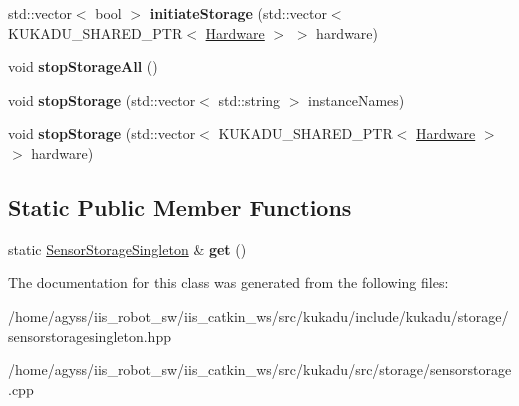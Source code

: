 \begin{DoxyCompactItemize}
\item 
std\+::vector$<$ bool $>$ {\bfseries initiate\+Storage} (std\+::vector$<$ K\+U\+K\+A\+D\+U\+\_\+\+S\+H\+A\+R\+E\+D\+\_\+\+P\+TR$<$ \hyperlink{classkukadu_1_1Hardware}{Hardware} $>$ $>$ hardware)\hypertarget{classkukadu_1_1SensorStorageSingleton_ad19fbc756b50b527869be6ddca355eec}{}\label{classkukadu_1_1SensorStorageSingleton_ad19fbc756b50b527869be6ddca355eec}

\item 
void {\bfseries stop\+Storage\+All} ()\hypertarget{classkukadu_1_1SensorStorageSingleton_a9c7a5f2c7bfe56911995a19b849ee9f9}{}\label{classkukadu_1_1SensorStorageSingleton_a9c7a5f2c7bfe56911995a19b849ee9f9}

\item 
void {\bfseries stop\+Storage} (std\+::vector$<$ std\+::string $>$ instance\+Names)\hypertarget{classkukadu_1_1SensorStorageSingleton_a090d1b7167f9581ee2080b475049b05e}{}\label{classkukadu_1_1SensorStorageSingleton_a090d1b7167f9581ee2080b475049b05e}

\item 
void {\bfseries stop\+Storage} (std\+::vector$<$ K\+U\+K\+A\+D\+U\+\_\+\+S\+H\+A\+R\+E\+D\+\_\+\+P\+TR$<$ \hyperlink{classkukadu_1_1Hardware}{Hardware} $>$ $>$ hardware)\hypertarget{classkukadu_1_1SensorStorageSingleton_a4ad27da5f31700493a1506ce694d0a2f}{}\label{classkukadu_1_1SensorStorageSingleton_a4ad27da5f31700493a1506ce694d0a2f}

\end{DoxyCompactItemize}
\subsection*{Static Public Member Functions}
\begin{DoxyCompactItemize}
\item 
static \hyperlink{classkukadu_1_1SensorStorageSingleton}{Sensor\+Storage\+Singleton} \& {\bfseries get} ()\hypertarget{classkukadu_1_1SensorStorageSingleton_a5642b288924a1083d58ce3ebbc08c6ec}{}\label{classkukadu_1_1SensorStorageSingleton_a5642b288924a1083d58ce3ebbc08c6ec}

\end{DoxyCompactItemize}


The documentation for this class was generated from the following files\+:\begin{DoxyCompactItemize}
\item 
/home/agyss/iis\+\_\+robot\+\_\+sw/iis\+\_\+catkin\+\_\+ws/src/kukadu/include/kukadu/storage/sensorstoragesingleton.\+hpp\item 
/home/agyss/iis\+\_\+robot\+\_\+sw/iis\+\_\+catkin\+\_\+ws/src/kukadu/src/storage/sensorstorage.\+cpp\end{DoxyCompactItemize}
